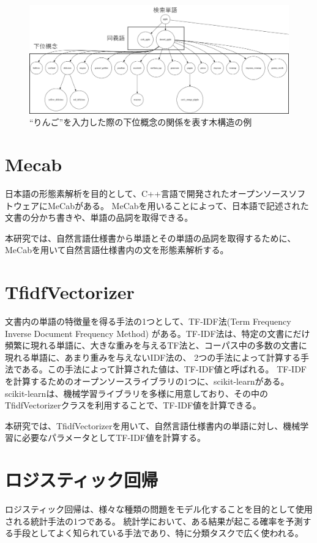 \begin{figure}[t]
    \begin{center}
        \includegraphics[width=1.0\columnwidth]{image/tree_structure.png}
        \caption{``りんご''を入力した際の下位概念の関係を表す木構造の例}
        \label{fig:tree_structure}
    \end{center}
\end{figure}

\section{Mecab}
\label{sec:mecab}
日本語の形態素解析を目的として、C++言語で開発されたオープンソースソフトウェアにMeCabがある\cite{}。
MeCabを用いることによって、日本語で記述された文書の分かち書きや、単語の品詞を取得できる。

本研究では、自然言語仕様書から単語とその単語の品詞を取得するために、MeCabを用いて自然言語仕様書内の文を形態素解析する。

\section{TfidfVectorizer}
\label{sec:tfidf}
文書内の単語の特徴量を得る手法の1つとして、TF-IDF法(Term Frequency Inverse Document Frequency Method)
がある\cite{}。TF-IDF法は、特定の文書にだけ頻繁に現れる単語に、大きな重みを与えるTF法と、コーパス中の多数の文書に現れる単語に、あまり重みを与えないIDF法の、
2つの手法によって計算する手法である。この手法によって計算された値は、TF-IDF値と呼ばれる。
TF-IDFを計算するためのオープンソースライブラリの1つに、scikit-learnがある。
scikit-learnは、機械学習ライブラリを多様に用意しており、その中のTfidfVectorizerクラスを利用することで、TF-IDF値を計算できる\cite{}。

本研究では、TfidfVectorizerを用いて、自然言語仕様書内の単語に対し、機械学習に必要なパラメータとしてTF-IDF値を計算する。

\section{ロジスティック回帰}
\label{sec:logistic}
ロジスティック回帰は、様々な種類の問題をモデル化することを目的として使用される統計手法の1つである。
統計学において、ある結果が起こる確率を予測する手段としてよく知られている手法であり、特に分類タスクで広く使われる。

